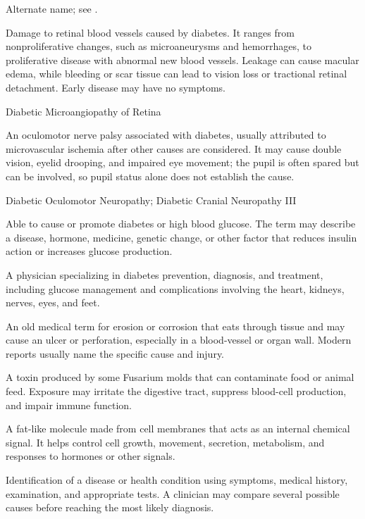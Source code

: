  Alternate name; see .

 Damage to retinal blood vessels caused by diabetes. It ranges from nonproliferative changes, such as microaneurysms and hemorrhages, to proliferative disease with abnormal new blood vessels. Leakage can cause macular edema, while bleeding or scar tissue can lead to vision loss or tractional retinal detachment. Early disease may have no symptoms.

\synonyms
Diabetic Microangiopathy of Retina

 An oculomotor nerve palsy associated with diabetes, usually attributed
to microvascular ischemia after other causes are considered. It may cause double vision, eyelid drooping,
and impaired eye movement; the pupil is often spared but can be involved,
so pupil status alone does not establish the cause.

\synonyms
Diabetic Oculomotor Neuropathy; Diabetic Cranial Neuropathy III

 Able to cause or promote diabetes or high blood glucose. The term may describe a disease, hormone, medicine, genetic change, or other factor that reduces insulin action or increases glucose production.

 A physician specializing in diabetes prevention, diagnosis, and treatment, including glucose management and complications involving the heart, kidneys, nerves, eyes, and feet.

 An old medical term for erosion or corrosion that eats through tissue and may cause an ulcer or perforation, especially in a blood-vessel or organ wall. Modern reports usually name the specific cause and injury.

 A toxin produced by some Fusarium molds that can contaminate food or animal feed. Exposure may irritate the digestive tract, suppress blood-cell production, and impair immune function.

 A fat-like molecule made from cell membranes that acts as an internal chemical signal. It helps control cell growth, movement, secretion, metabolism, and responses to hormones or other signals.

 Identification of a disease or health condition using symptoms, medical history, examination, and appropriate tests. A clinician may compare several possible causes before reaching the most likely diagnosis.

